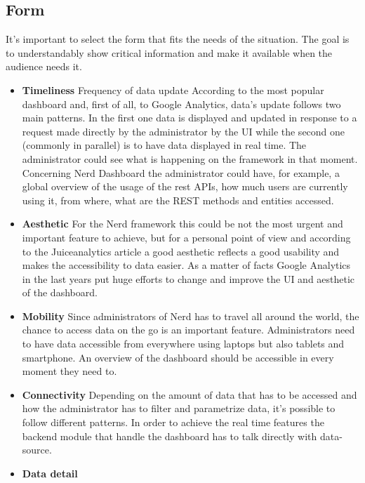 \documentclass[a4paper,13pt]{report}
\begin{document}
\subsection{Form}
It's important to select the form that fits the needs of the situation.
The goal is to understandably show critical information and make it available when the audience needs it.
\begin{itemize}
\item  \textbf{Timeliness}\newline
Frequency of  data update
According to the most popular dashboard and, first of all, to Google Analytics, data's update follows two main patterns. In the first one data  is displayed and updated in response to a request made directly by the administrator by the UI while the second one (commonly in parallel) is to have data  displayed in real time. The administrator could see what is happening on the framework in that moment. Concerning Nerd Dashboard the administrator could have, for example, a global overview of the usage of the rest APIs, how much users are currently using it, from where, what are the REST methods and entities accessed.
\item \textbf{Aesthetic}\newline
For the Nerd framework this could be not the most urgent and important feature to achieve, but for a personal point of view and according to the Juiceanalytics article \cite{Juice} a good aesthetic reflects a good usability and makes the accessibility to  data easier.
As a matter of facts Google Analytics in the last years put huge efforts to change and improve the UI and aesthetic of the dashboard.
\item\textbf{Mobility}\newline
Since administrators of Nerd has to travel all around the world, the chance to access data on the go is an important feature. Administrators need to have data accessible from everywhere using laptops but also tablets and smartphone. An overview of the dashboard should be accessible in every moment they need to.
\item \textbf{Connectivity}\newline
Depending on the amount of data that has to be accessed and how the administrator has to filter and parametrize data, it's possible to follow different patterns. 
In order to achieve the real time features the backend module that handle the dashboard has to talk directly with data-source.
\item \textbf{Data detail}\newline

\end{itemize}
\end{document}
